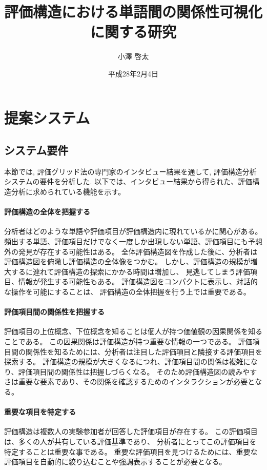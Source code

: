 \documentclass[syuuron]{kuee}
\title{評価構造における単語間の関係性可視化に関する研究}
\author{小澤 啓太}
\date{平成28年2月4日}
\begin{document}
\maketitle
\tableofcontents



\chapter{提案システム}
	\section{システム要件}
		本節では, 評価グリッド法の専門家のインタビュー結果\cite{hak1}を通して, 評価構造分析システムの要件を分析した. 
		以下では、インタビュー結果から得られた、評価構造分析に求められている機能を示す。
		\subsubsection{評価構造の全体を把握する}
			分析者はどのような単語や評価項目が評価構造内に現れているかに関心がある。
			頻出する単語、評価項目だけでなく一度しか出現しない単語、評価項目にも予想外の発見が存在する可能性はある。
			全体評価構造図を作成した後に、分析者は評価構造図を俯瞰し評価構造の全体像をつかむ。
			しかし、評価構造の規模が増大するに連れて評価構造の探索にかかる時間は増加し、
			見逃してしまう評価項目、情報が発生する可能性もある。
			評価構造図をコンパクトに表示し、対話的な操作を可能にすることは、
			評価構造の全体把握を行う上では重要である。
		\subsubsection{評価項目間の関係性を把握する}
			評価項目の上位概念、下位概念を知ることは個人が持つ価値観の因果関係を知ることである。
			この因果関係は評価構造が持つ重要な情報の一つである。
			評価項目間の関係性を知るためには、分析者は注目した評価項目と隣接する評価項目を探索する。
			評価構造の規模が大きくなるにつれ、評価項目間の関係は複雑になり、評価項目間の関係性は把握しづらくなる。
			そのため評価構造図の読みやすさは重要な要素であり、その関係を確認するためのインタラクションが必要となる。
		\subsubsection{重要な項目を特定する}
			評価構造は複数人の実験参加者が回答した評価項目が存在する。
			この評価項目は、多くの人が共有している評価基準であり、
			分析者にとってこの評価項目を特定することは重要な事である。
			重要な評価項目を見つけるためには、重要な評価項目を自動的に絞り込むことや強調表示することが必要となる。
\end{document}
